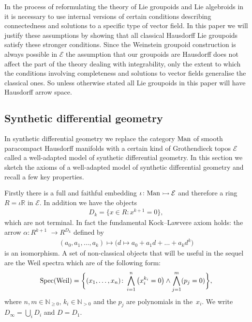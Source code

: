 \documentclass[pdftex]{sigma}
\numberwithin{equation}{section}
\begin{document}
In the process of reformulating the theory of Lie groupoids and Lie algebroids in~\cite{burke-relative-to-local-models} it is necessary to use internal versions of certain conditions describing connectedness and solutions to a specif\/ic type of vector f\/ield. In this paper we will justify these assumptions by showing that all classical Hausdorf\/f Lie groupoids satisfy these stronger conditions. Since the Weinstein groupoid construction is always possible in $\mathcal{E}$ the assumption that our groupoids are Hausdorf\/f does not af\/fect the part of the theory dealing with integrability, only the extent to which the conditions involving completeness and solutions to vector f\/ields generalise the classical ones. So unless otherwise stated all Lie groupoids in this paper will have Hausdorf\/f arrow space.

\subsection{Synthetic dif\/ferential geometry}\label{sec:sdg}

In synthetic dif\/ferential geometry we replace the category ${\rm Man}$ of smooth paracompact Hausdorf\/f manifolds with a certain kind of Grothendieck topos $\mathcal{E}$ called a well-adapted model of synthetic dif\/ferential geometry. In this section we sketch the axioms of a well-adapted model of synthetic dif\/ferential geometry and recall a few key properties.

Firstly there is a full and faithful embedding $\iota\colon {\rm Man} \rightarrowtail \mathcal{E}$ and therefore a ring $R=\iota\mathbb{R}$ in $\mathcal{E}$.
In addition we have the objects
\begin{gather*}D_k=\big\{x\in R\colon x^{k+1}=0\big\},\end{gather*}
which are not terminal. In fact the fundamental Kock--Lawvere axiom holds: the arrow $\alpha\colon R^{k+1}$ $\rightarrow R^{D_k}$ def\/ined by
\begin{gather*}(a_0,a_1,\dots ,a_k)\mapsto\big(d\mapsto a_0+a_1d+\dots +a_kd^k\big)\end{gather*}
is an isomorphism. A set of non-classical objects that will be useful in the sequel are the Weil spectra which are of the following form:
\begin{gather*}{\rm Spec}({\rm Weil}) = \bigg\{(x_1,\dots ,x_n)\colon \bigwedge_{i=1}^n\big(x_i^{k_i}=0\big)\wedge\bigwedge_{j=1}^m(p_j=0)\bigg\},\end{gather*}
where $n,m\in\mathbb{N}_{\geq 0}$, $k_i\in \mathbb{N}_{>0}$ and the $p_j$ are polynomials in the~$x_i$. We write $D_{\infty}=\bigcup_i D_i$ and $D=D_1$.
\end{document}
